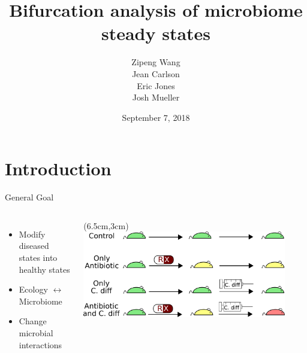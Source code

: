 \documentclass[15pt]{beamer}
\title[Your Short Title]{Bifurcation analysis of microbiome steady states}
\author{Zipeng Wang\\ Jean Carlson\\ Eric Jones\\ Josh Mueller}
\institute{UCSB}
\date{September 7,  2018}
\begin{document}
\begin{frame}
  \titlepage
\end{frame}


\section{Introduction}

\begin{frame}{General Goal}
\begin{columns}
\begin{itemize}
	\item Modify diseased states into healthy states
	\item Ecology $\leftrightarrow$ Microbiome
	\item Change microbial interactions
\end{itemize}
 
	\begin{textblock*}{6.8cm}(6.5cm,3cm) %
	 \includegraphics[width=0.9\textwidth]{mouse_final}\\[-1ex]
	 {\tiny }
	\end{textblock*}
\end{columns}
\end{frame}
\end{document}
